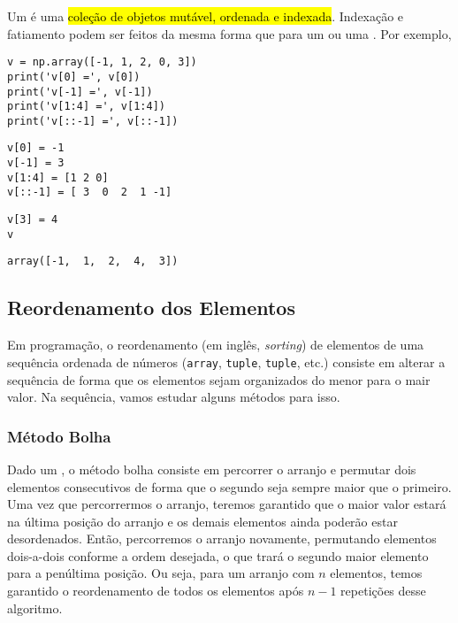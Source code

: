 Um {\PYTHONnumpyDOTarray} é uma \hl{coleção de objetos mutável, ordenada e indexada}. Indexação e fatiamento podem ser feitos da mesma forma que para um {\PYTHONtuple} ou uma {\PYTHONlist}. Por exemplo,

\begin{lstlisting}
v = np.array([-1, 1, 2, 0, 3])
print('v[0] =', v[0])
print('v[-1] =', v[-1])
print('v[1:4] =', v[1:4])
print('v[::-1] =', v[::-1])
\end{lstlisting}

\begin{verbatim}
v[0] = -1
v[-1] = 3
v[1:4] = [1 2 0]
v[::-1] = [ 3  0  2  1 -1]
\end{verbatim}

\begin{lstlisting}
v[3] = 4
v
\end{lstlisting}

\begin{verbatim}
array([-1,  1,  2,  4,  3])
\end{verbatim}


\subsection{Reordenamento dos Elementos}

Em programação, o reordenamento (em inglês, \textit{sorting}) de elementos de uma sequência ordenada de números (\texttt{array}, \texttt{tuple}, \texttt{tuple}, etc.) consiste em alterar a sequência de forma que os elementos sejam organizados do menor para o mair valor. Na sequência, vamos estudar alguns métodos para isso.

\subsubsection{Método Bolha}

Dado um {\PYTHONnumpyDOTarray}, o método bolha consiste em percorrer o arranjo e permutar dois elementos consecutivos de forma que o segundo seja sempre maior que o primeiro. Uma vez que percorrermos o arranjo, teremos garantido que o maior valor estará na última posição do arranjo e os demais elementos ainda poderão estar desordenados. Então, percorremos o arranjo novamente, permutando elementos dois-a-dois conforme a ordem desejada, o que trará o segundo maior elemento para a penúltima posição. Ou seja, para um arranjo com $n$ elementos, temos garantido o reordenamento de todos os elementos após $n-1$ repetições desse algoritmo.

